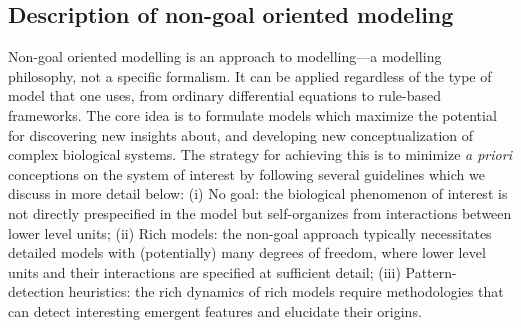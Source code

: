 \subsection{Description of non-goal oriented modeling}

Non-goal oriented modelling is an approach to modelling---a modelling philosophy, not a specific formalism. It can be applied regardless of the type of model that one uses, from ordinary differential equations to rule-based frameworks. The core idea is to formulate models which maximize the potential for discovering new insights about, and developing new conceptualization of complex biological systems. The strategy for achieving this is to minimize \emph{a priori} conceptions on the system of interest by following several guidelines which we discuss in more detail below: (i) No goal: the biological phenomenon of interest is not directly prespecified in the model but self-organizes from interactions between lower level units; (ii) Rich models: the non-goal approach typically necessitates detailed models with (potentially) many degrees of freedom, where lower level units and their interactions are specified at sufficient detail; (iii) Pattern-detection heuristics: the rich dynamics of rich models require methodologies that can  detect interesting emergent features and elucidate their origins.

  